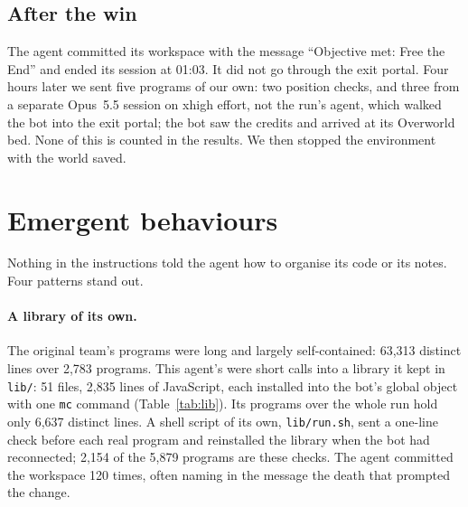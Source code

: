 \documentclass[11pt,a4paper]{article}
\begin{document}
\subsection{After the win}

The agent committed its workspace with the message ``Objective met: Free the End'' and ended its session at 01:03. It did not go through the exit portal. Four hours later we sent five programs of our own: two position checks, and three from a separate Opus~5.5 session on xhigh effort, not the run's agent, which walked the bot into the exit portal; the bot saw the credits and arrived at its Overworld bed. None of this is counted in the results. We then stopped the environment with the world saved.

\section{Emergent behaviours}

Nothing in the instructions told the agent how to organise its code or its notes. Four patterns stand out.

\paragraph{A library of its own.} The original team's programs were long and largely self-contained: 63,313 distinct lines over 2,783 programs. This agent's were short calls into a library it kept in \texttt{lib/}: 51 files, 2,835 lines of JavaScript, each installed into the bot's global object with one \texttt{mc} command (Table~\ref{tab:lib}). Its programs over the whole run hold only 6,637 distinct lines. A shell script of its own, \texttt{lib/run.sh}, sent a one-line check before each real program and reinstalled the library when the bot had reconnected; 2,154 of the 5,879 programs are these checks. The agent committed the workspace 120 times, often naming in the message the death that prompted the change.
\end{document}
